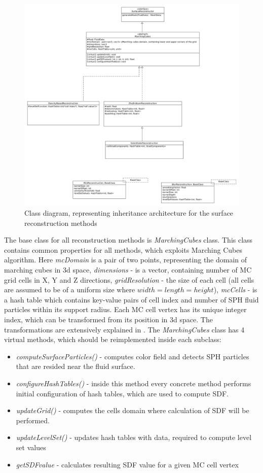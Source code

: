 \begin{figure}[H]
	\begin{center}
		\includegraphics[width=\textwidth]{figures/ClassDiagram.png}
	\end{center}
	\caption{Class diagram, representing inheritance architecture for the surface reconstruction methods}
    \label{fig:class-diagam}
\end{figure}
The base class for all reconstruction methods is \emph{MarchingCubes} class. This class contains common properties for all methods, which exploits Marching Cubes algorithm. Here \emph{mcDomain} is a pair of two points, representing the domain of marching cubes in 3d space, \emph{dimensions} - is a vector, containing number of MC grid cells in X, Y and Z directions, \emph{gridResolution} - the size of each cell (all cells are assumed to be of a uniform size where $width=length=height$), \emph{mcCells} - is a hash table which contains key-value pairs of cell index and number of SPH fluid particles within its support radius. Each MC cell vertex has its unique integer index, which can be transformed from its position in 3d space. The transformations are extensively explained in \cite{Akinchi}. 
The \emph{MarchingCubes} class has 4 virtual methods, which should be reimplemented inside each subclass:
\begin{itemize}
	\item \emph{computeSurfaceParticles()} - computes color field and detects SPH particles that are resided near the fluid surface.
	\item \emph{configureHashTables()} - inside this method every concrete method performs initial configuration of hash tables, which are used to compute SDF.
	\item \emph{updateGrid()} - computes the cells domain where calculation of SDF will be performed.
	\item \emph{updateLevelSet()} - updates hash tables with data, required to compute level set values
	\item \emph{getSDFvalue} - calculates resulting SDF value for a given MC cell vertex
\end{itemize}

